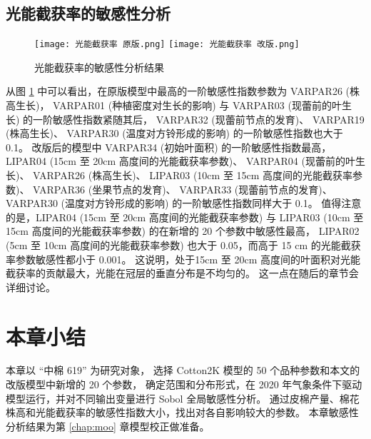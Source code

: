 \subsection{光能截获率的敏感性分析}
\begin{figure}
    \centering
    \texttt{[image: 光能截获率 原版.png]}
    \texttt{[image: 光能截获率 改版.png]}
    \caption{光能截获率的敏感性分析结果}\label{fig:saLightInterception}
\end{figure}

从图 \ref{fig:saLightInterception} 中可以看出，在原版模型中最高的一阶敏感性指数参数为 VARPAR26 (株高生长)，%
VARPAR01 (种植密度对生长的影响) 与 VARPAR03 (现蕾前的叶生长) 的一阶敏感性指数紧随其后，
VARPAR32 (现蕾前节点的发育)、%
VARPAR19 (株高生长)、%
VARPAR30 (温度对方铃形成的影响) 的一阶敏感性指数也大于 0.1。%
改版后的模型中 VARPAR34 (初始叶面积) 的一阶敏感性指数最高，%
LIPAR04 (15cm 至 20cm 高度间的光能截获率参数)、
VARPAR04 (现蕾前的叶生长)、
VARPAR26 (株高生长)、%
LIPAR03 (10cm 至 15cm 高度间的光能截获率参数)、%
VARPAR36 (坐果节点的发育)、%
VARPAR33 (现蕾前节点的发育)、%
VARPAR30 (温度对方铃形成的影响) 的一阶敏感性指数同样大于 0.1。
值得注意的是，LIPAR04 (15cm 至 20cm 高度间的光能截获率参数) 与 LIPAR03 (10cm 至 15cm 高度间的光能截获率参数) 的在新增的 20 个参数中敏感性最高，%
LIPAR02 (5cm 至 10cm 高度间的光能截获率参数) 也大于 0.05，而高于 15 cm 的光能截获率参数敏感性都小于 0.001。%
这说明，处于15cm 至 20cm 高度间的叶面积对光能截获率的贡献最大，光能在冠层的垂直分布是不均匀的。%
这一点在随后的章节会详细讨论。

\section{本章小结}
本章以 “中棉 619” 为研究对象，%
选择 Cotton2K 模型的 50 个品种参数和本文的改版模型中新增的 20 个参数，%
确定范围和分布形式，在 2020 年气象条件下驱动模型运行，并对不同输出变量进行 Sobol 全局敏感性分析。%
通过皮棉产量、棉花株高和光能截获率的敏感性指数大小，找出对各自影响较大的参数。%
本章敏感性分析结果为第 \ref{chap:moo} 章模型校正做准备。
